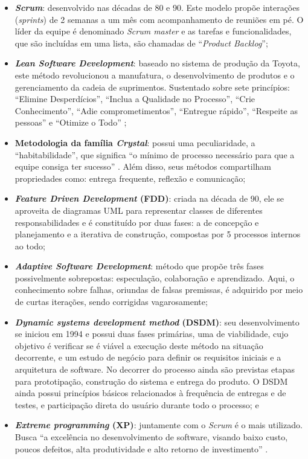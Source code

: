 \begin{itemize}
 \item \textbf{\textit{Scrum}}: desenvolvido nas décadas de 80 e 90. Este modelo propõe interações (\textit{sprints}) de 2 semanas a um mês com acompanhamento de reuniões em pé. O líder da equipe é denominado \textit{Scrum master} e as tarefas e funcionalidades, que são incluídas em uma lista, são chamadas de ``\textit{Product Backlog}'';   
 \item \textbf{\textit{Lean Software Development}}: baseado no sistema de produção da Toyota, este método revolucionou a manufatura, o desenvolvimento de produtos e o gerenciamento da cadeia de suprimentos. Sustentado sobre sete princípios: ``Elimine Desperdícios'', ``Inclua a Qualidade no Processo'', ``Crie Conhecimento'', ``Adie comprometimentos'', ``Entregue rápido'', ``Respeite as pessoas'' e ``Otimize o Todo'' \cite{sato2007uso};
 \item \textbf{Metodologia da família \textit{Crystal}}: possui uma peculiaridade, a ``habitabilidade'', que significa ``o mínimo de processo necessário para que a equipe consiga ter sucesso'' \cite{sato2007uso}. Além disso, seus métodos compartilham propriedades como: entrega frequente, reflexão e comunicação;
 \item \textbf{\textit{Feature Driven Development} (FDD)}: criada na década de 90, ele se aproveita de diagramas UML para representar classes de diferentes responsabilidades e é constituído por duas fases: a de concepção e planejamento e a iterativa de construção, compostas por 5 processos internos ao todo;
 \item \textbf{\textit{Adaptive Software Development}}: método que propõe três fases possivelmente sobrepostas: especulação, colaboração e aprendizado. Aqui, o conhecimento sobre falhas, oriundas de falsas premissas, é adquirido por meio de curtas iterações, sendo corrigidas vagarosamente;
 \item \textbf{\textit{Dynamic systems development method} (DSDM)}: seu desenvolvimento se iniciou em 1994 e possui duas fases primárias, uma de viabilidade, cujo objetivo é verificar se é viável a execução deste método na situação decorrente, e um estudo de negócio para definir os requisitos iniciais e a arquitetura de software. No decorrer do processo ainda são previstas etapas para prototipação, construção do sistema e entrega do produto. O DSDM ainda possui princípios básicos relacionados à frequência de entregas e de testes, e participação direta do usuário durante todo o processo; e
 \item \textbf{\textit{Extreme programming} (XP)}: juntamente com o \textit{Scrum} é o mais utilizado. Busca ``a excelência no desenvolvimento de software, visando baixo custo, poucos defeitos, alta produtividade e alto retorno de investimento'' \cite{sato2007uso}.
\end{itemize}

